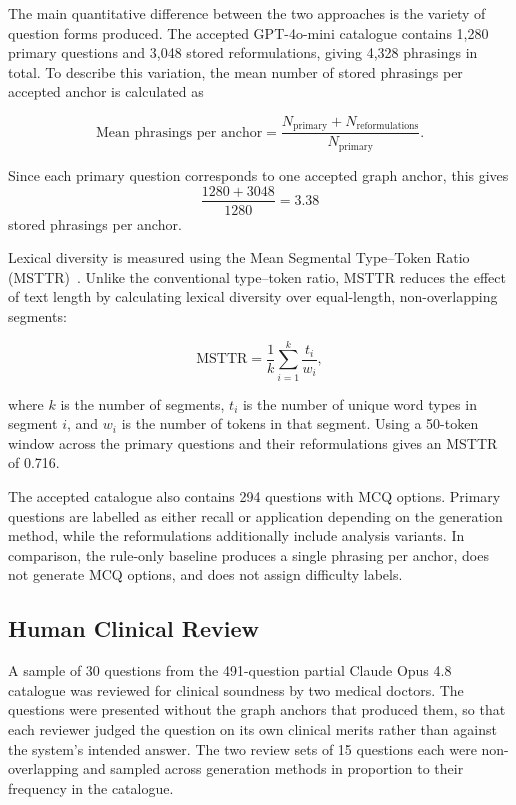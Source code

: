 The main quantitative difference between the two approaches is the variety of question forms produced.
The accepted GPT-4o-mini catalogue contains 1,280 primary questions and 3,048 stored reformulations, giving 4,328 phrasings in total. To describe this variation, the mean number of stored phrasings per accepted anchor is calculated as

\[
\text{Mean phrasings per anchor}
=
\frac{N_{\mathrm{primary}} + N_{\mathrm{reformulations}}}
     {N_{\mathrm{primary}}}.
\]

Since each primary question corresponds to one accepted graph anchor, this gives
\[
\frac{1280 + 3048}{1280} = 3.38
\]
stored phrasings per anchor.

Lexical diversity is measured using the Mean Segmental Type--Token Ratio (MSTTR)~\cite{Ahn2025}. Unlike the conventional type--token ratio, MSTTR reduces the effect of text length by calculating lexical diversity over equal-length, non-overlapping segments:

\[
\mathrm{MSTTR}
=
\frac{1}{k}\sum_{i=1}^{k}\frac{t_i}{w_i},
\]

where \(k\) is the number of segments, \(t_i\) is the number of unique word types in segment \(i\), and \(w_i\) is the number of tokens in that segment. Using a 50-token window across the primary questions and their reformulations gives an MSTTR of 0.716.

The accepted catalogue also contains 294 questions with MCQ options. Primary questions are labelled as either recall or application depending on the generation method, while the reformulations additionally include analysis variants. In comparison, the rule-only baseline produces a single phrasing per anchor, does not generate MCQ options, and does not assign difficulty labels.

\subsection{Human Clinical Review}
\label{sec:exp_quality-human}

A sample of 30 questions from the 491-question partial Claude Opus 4.8 catalogue was reviewed for clinical soundness by two medical doctors. The questions were presented without the graph anchors that produced
them, so that each reviewer judged the question on its own clinical merits
rather than against the system's intended answer. The two review sets of 15
questions each were non-overlapping and sampled across generation methods in
proportion to their frequency in the catalogue.


